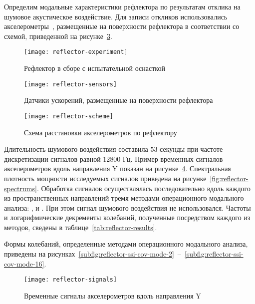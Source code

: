 Определим модальные характеристики рефлектора  по результатам отклика на шумовое акустическое воздействие. Для записи откликов использовались акселерометры~, размещенные на поверхности рефлектора в соответствии со схемой, приведенной на рисунке~\ref{fig:reflector-scheme}.

\begin{figure}[!htb]
	\centerfloat
	\texttt{[image: reflector-experiment]}
	\caption{Рефлектор в сборе с испытательной оснасткой} \label{fig:reflector-experiment}
\end{figure}

\begin{figure}[!htb]
	\centerfloat
	\texttt{[image: reflector-sensors]}
	\caption{Датчики ускорений, размещенные на поверхности рефлектора} \label{fig:reflector-sensors}
\end{figure}

\begin{figure}[!htb]
	\centerfloat
	\texttt{[image: reflector-scheme]}
	\caption{Схема расстановки акселерометров по рефлектору} \label{fig:reflector-scheme}
\end{figure}

Длительность шумового воздействия составила $ 53 $ секунды при частоте дискретизации сигналов равной $ 12800 $ Гц. Пример временных сигналов акселерометров вдоль направления Y показан на рисунке~\ref{fig:reflector-signals}. Спектральная плотность мощности исследуемых сигналов приведена на рисунке~\ref{fig:reflector-spectrums}. Обработка сигналов осуществлялась последовательно вдоль каждого из пространственных направлений тремя методами операционного модального анализа: ,  и . При этом сигнал шумового воздействия не использовался. Частоты и логарифмические декременты колебаний, полученные посредством каждого из методов, сведены в таблице~\ref{tab:reflector-results}.

Формы колебаний, определенные методами операционного модального анализа, приведены на рисунках~\ref{subfig:reflector-ssi-cov-mode-2}~--~\ref{subfig:reflector-ssi-cov-mode-16}.

\begin{figure}[!htb]
	\centerfloat
	\texttt{[image: reflector-signals]}
	\caption{Временные сигналы акселерометров вдоль направления Y} \label{fig:reflector-signals}
\end{figure}

